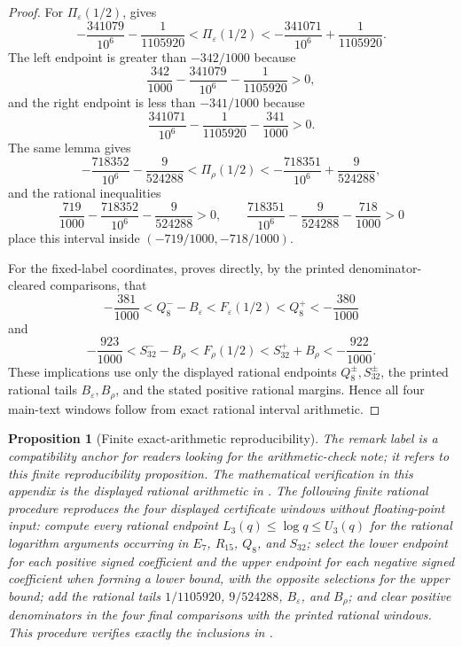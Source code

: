 \documentclass[11pt,a4paper]{amsart}
\theoremstyle{plain}
\newtheorem{proposition}[theorem]{Proposition}
\theoremstyle{definition}
\theoremstyle{remark}
\begin{document}
\begin{proof}
  For \(\Pi_\varepsilon(1/2)\),
   gives
  \[
    -\frac{341079}{10^6}-\frac{1}{1105920}
    <\Pi_\varepsilon(1/2)<
    -\frac{341071}{10^6}+\frac{1}{1105920}.
  \]
  The left endpoint is greater than \(-342/1000\) because
  \[
    \frac{342}{1000}-\frac{341079}{10^6}-\frac{1}{1105920}>0,
  \]
  and the right endpoint is less than \(-341/1000\) because
  \[
    \frac{341071}{10^6}-\frac{1}{1105920}-\frac{341}{1000}>0.
  \]
  The same lemma gives
  \[
    -\frac{718352}{10^6}-\frac{9}{524288}
    <\Pi_\rho(1/2)<
    -\frac{718351}{10^6}+\frac{9}{524288},
  \]
  and the rational inequalities
  \[
    \frac{719}{1000}-\frac{718352}{10^6}-\frac{9}{524288}>0,
    \qquad
    \frac{718351}{10^6}-\frac{9}{524288}-\frac{718}{1000}>0
  \]
  place this interval inside
  \((-719/1000,-718/1000)\).

  For the fixed-label coordinates,
   proves directly, by the printed
  denominator-cleared comparisons, that
  \[
    -\frac{381}{1000}<Q_8^- -B_\varepsilon
    <F_\varepsilon(1/2)<Q_8^+<-\frac{380}{1000}
  \]
  and
  \[
    -\frac{923}{1000}<S_{32}^- -B_\rho
    <F_\rho(1/2)<S_{32}^+ +B_\rho<-\frac{922}{1000}.
  \]
  These implications use only the displayed rational endpoints
  \(Q_8^\pm,S_{32}^\pm\), the printed rational tails
  \(B_\varepsilon,B_\rho\), and the stated positive rational margins.  Hence all
  four main-text windows follow from exact rational interval arithmetic.
\end{proof}

\begin{proposition}[Finite exact-arithmetic reproducibility]
  \label{rem:s3-finite-arithmetic-check}
  \label{prop:s3-finite-arithmetic-reproducibility}
  The remark label is a compatibility anchor for readers looking for the
  arithmetic-check note; it refers to this finite reproducibility proposition.
  The mathematical verification in this appendix is the displayed rational
  arithmetic in
  .
  The following finite rational procedure reproduces the four displayed
  certificate windows without floating-point input: compute every rational
  endpoint \(L_3(q)\le\log q\le U_3(q)\) for the rational logarithm arguments
  occurring in \(E_7\), \(R_{15}\), \(Q_8\), and \(S_{32}\); select the lower
  endpoint for each positive signed coefficient and the upper endpoint for each
  negative signed coefficient when forming a lower bound, with the opposite
  selections for the upper bound; add the rational tails
  \(1/1105920\), \(9/524288\), \(B_\varepsilon\), and \(B_\rho\); and clear
  positive denominators in the four final comparisons with the printed
  rational windows.  This procedure verifies exactly the inclusions in
  .
\end{proposition}
\end{document}
